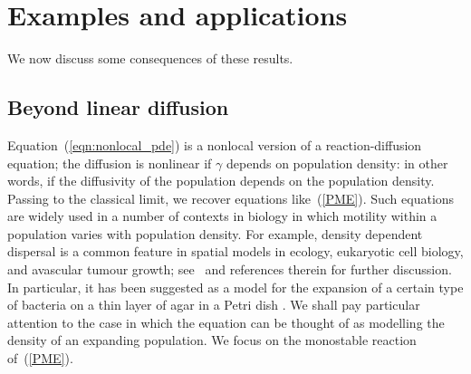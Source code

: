 \documentclass[EJP]{ejpecp} %
\newcommand{\citep}[1]{\cite{#1}}
\begin{document}
\section{Examples and applications}
\label{sec:applications}

We now discuss some consequences of these results.

\subsection{Beyond linear diffusion}
\label{beyond linear diffusion}

Equation~(\ref{eqn:nonlocal_pde}) is a nonlocal version of a reaction-diffusion equation;
the diffusion is nonlinear if $\gamma$ depends on population density:
in other words, if the diffusivity of the population depends on the population density.
Passing to the classical limit, we recover equations like~(\ref{PME}).
Such equations are widely used in a number of contexts in biology in which
motility within a population varies with population density.
For example, density dependent dispersal is a common feature in spatial
models in ecology, eukaryotic cell biology, and avascular tumour growth;
see~\cite{sherratt:2010} and references therein for further discussion. 
In particular, it has been suggested as a model for
the expansion of a certain type of bacteria %
on a thin layer of agar in a Petri dish 
\citep{cohen/golding/kozlovsky/benjacob/ron:1999}. 
We shall pay particular attention to the case in which the equation can be 
thought of as modelling the density of an expanding population. 
We focus on the monostable reaction of~(\ref{PME}).
\end{document}

